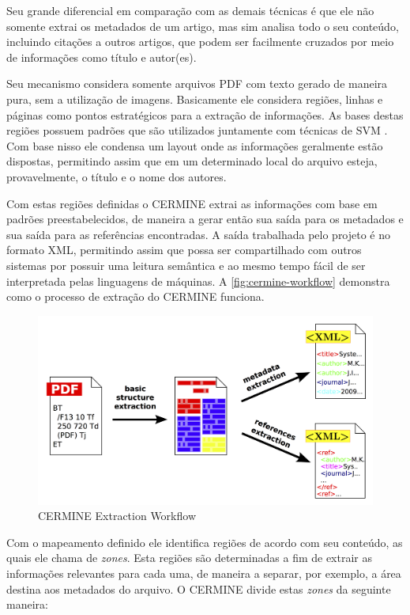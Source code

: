 Seu grande diferencial em comparação com as demais técnicas é que ele não somente extrai os metadados de um artigo, mas sim analisa todo o seu conteúdo, incluindo citações a outros artigos, que podem ser facilmente cruzados por meio de informações como título e autor(es).

Seu mecanismo considera somente arquivos PDF com texto gerado de maneira pura, sem a utilização de imagens. Basicamente ele considera regiões, linhas e páginas como pontos estratégicos para a extração de informações. As bases destas regiões possuem padrões que são utilizados juntamente com técnicas de SVM \cite{Han-SVM}. Com base nisso ele condensa um layout onde as informações geralmente estão dispostas, permitindo assim que em um determinado local do arquivo esteja, provavelmente, o título e o nome dos autores. 

Com estas regiões definidas o CERMINE extrai as informações com base em padrões preestabelecidos, de maneira a gerar então sua saída para os metadados e sua saída para as referências encontradas. A saída trabalhada pelo projeto é no formato XML, permitindo assim que possa ser compartilhado com outros sistemas por possuir uma leitura semântica e ao mesmo tempo fácil de ser interpretada pelas linguagens de máquinas. A \autoref{fig:cermine-workflow} demonstra como o processo de extração do CERMINE funciona.

\begin{figure}
\centering
\caption{CERMINE Extraction Workflow}
\label{fig:cermine-workflow}
\includegraphics[width=0.7\linewidth]{./assets/cermine}
\end{figure}

Com o mapeamento definido ele identifica regiões de acordo com seu conteúdo, as quais ele chama de \textit{zones}. Esta regiões são determinadas a fim de extrair as informações relevantes para cada uma, de maneira a separar, por exemplo, a área destina aos metadados do arquivo. O CERMINE divide estas \textit{zones} da seguinte maneira:


